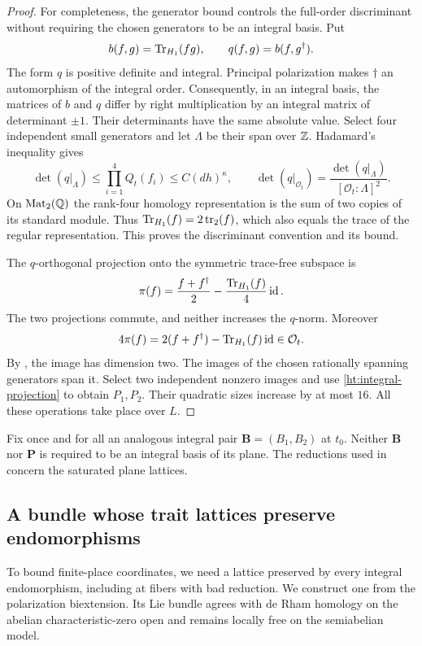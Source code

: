 \begin{proof}
For completeness, the generator bound controls the full-order
discriminant without requiring the chosen generators to be an integral
basis. Put
\[
 b(f,g)=\operatorname{Tr}_{H_1}(fg),\qquad q(f,g)=b(f,g^\dagger).
\]
The form $q$ is positive definite and integral. Principal polarization
makes $\dagger$ an automorphism of the integral order. Consequently,
in an integral basis, the matrices of $b$ and $q$ differ by right
multiplication by an integral matrix of determinant $\pm1$. Their
determinants have the same absolute value. Select four independent
small generators and let $\Lambda$ be their span over $\mathbb Z$.
Hadamard's inequality gives
\[
 \det(q|_\Lambda)\leq\prod_{i=1}^4 Q_t(f_i)
       \leq C(dh)^\kappa,
 \qquad
 \det(q|_{\mathcal O_t})
       =\frac{\det(q|_\Lambda)}{[\mathcal O_t:\Lambda]^2}.
\]
On $\operatorname{Mat}_2(\mathbb Q)$ the rank-four homology representation is the sum of
two copies of its standard module. Thus
$\operatorname{Tr}_{H_1}(f)=2\operatorname{tr}_2(f)$, which also equals the trace of the regular
representation. This proves the discriminant convention and its bound.

The $q$-orthogonal projection onto the symmetric trace-free subspace is
\[
 \pi(f)=\frac{f+f^\dagger}{2}
             -\frac{\operatorname{Tr}_{H_1}(f)}4\operatorname{id}.
\]
The two projections commute, and neither increases the $q$-norm.
Moreover
\begin{equation}\label{ht:integral-projection}
 4\pi(f)=2(f+f^\dagger)-\operatorname{Tr}_{H_1}(f)\operatorname{id}\in\mathcal O_t.
\end{equation}
By , the image has dimension two. The images of
the chosen rationally spanning generators span it. Select two
independent nonzero images and use \eqref{ht:integral-projection} to
obtain $P_1,P_2$. Their quadratic sizes increase by at most $16$.
All these operations take place over $L$.
\end{proof}

Fix once and for all an analogous integral pair
$\mathbf B=(B_1,B_2)$ at $t_0$. Neither $\mathbf B$ nor $\mathbf P$
is required to be an integral basis of its plane. The reductions used
in  concern the saturated plane lattices.

\subsection{A bundle whose trait lattices preserve endomorphisms}

To bound finite-place coordinates, we need a lattice preserved by every
integral endomorphism, including at fibers with bad reduction. We construct
one from the polarization biextension. Its Lie bundle agrees with de Rham
homology on the abelian characteristic-zero open and remains locally free
on the semiabelian model.


